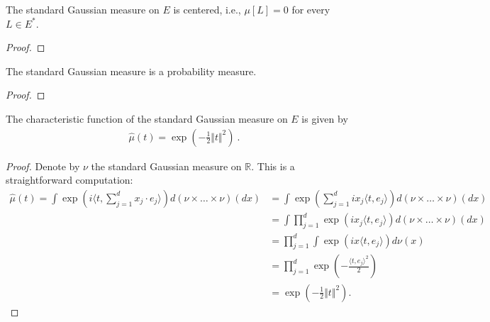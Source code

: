 \begin{lemma}\label{lem:isCentered_stdGaussian}
  \leanok
The standard Gaussian measure on $E$ is centered, i.e., $\mu[L] = 0$ for every $L \in E^*$.
\end{lemma}

\begin{proof}\leanok

\end{proof}


\begin{lemma}\label{lem:isProbabilityMeasure_stdGaussian}
  \leanok
The standard Gaussian measure is a probability measure.
\end{lemma}

\begin{proof}\leanok

\end{proof}


\begin{lemma}\label{lem:charFun_stdGaussian}
  \leanok
The characteristic function of the standard Gaussian measure on $E$ is given by
\begin{align*}
  \hat{\mu}(t) = \exp\left(-\frac{1}{2} \Vert t \Vert^2 \right) \: .
\end{align*}
\end{lemma}

\begin{proof}\leanok
Denote by $\nu$ the standard Gaussian measure on $\mathbb{R}$. This is a straightforward computation:
\begin{align*}
  \hat{\mu}(t) = \int \exp\left(i\langle t, \sum_{j=1}^d x_j \cdot e_j \rangle\right) d(\nu \times \ldots \times \nu)(dx) &= \int \exp\left(\sum_{j=1}^d ix_j\langle t, e_j \rangle\right) d(\nu \times \ldots \times \nu)(dx) \\
  &= \int \prod_{j=1}^d \exp\left(ix_j\langle t, e_j \rangle\right) d(\nu \times \ldots \times \nu)(dx) \\
  &= \prod_{j=1}^d \int \exp\left(ix\langle t, e_j \rangle\right) d\nu(x) \\
  &= \prod_{j=1}^d \exp\left(-\frac{\langle t, e_j \rangle^2}{2}\right) \\
  &= \exp\left(-\frac{1}{2} \Vert t \Vert^2 \right).
\end{align*}
\end{proof}


